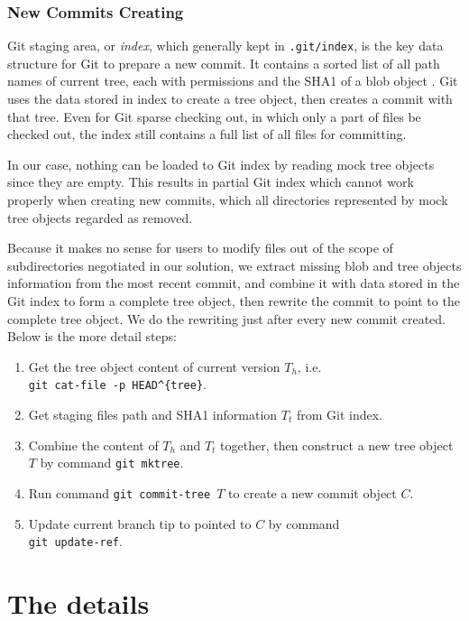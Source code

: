 \documentclass[preprint]{sigplanconf}
\begin{document}
\subsubsection{New Commits Creating}
Git staging area, or \emph{index}, which generally kept in \verb|.git/index|,
is the key data structure for Git to prepare a new commit.
It contains a sorted list of all path names of current tree, each with
permissions and the SHA1 of a blob object \cite{idx-format}.
Git uses the data stored in index to create a tree object, then creates a
commit with that tree.
Even for Git sparse checking out, in which only a part of files be checked
out, the index still contains a full list of all files for committing.

In our case, nothing can be loaded to Git index by reading mock tree objects
since they are empty.
This results in partial Git index which cannot work properly when creating new
commits, which all directories represented by mock tree objects regarded as
removed.

Because it makes no sense for users to modify files out of the scope of
subdirectories negotiated in our solution, we extract missing blob and tree
objects information from the most recent commit, and combine it with data
stored in the Git index to form a complete tree object, then rewrite the commit
to point to the complete tree object.
We do the rewriting just after every new commit created.
Below is the more detail steps:

\begin{enumerate}
  \item Get the tree object content of current version $T_h$, i.e. \\
        \verb|git cat-file -p HEAD^{tree}|.
  \item Get staging files path and SHA1 information $T_t$ from Git index.
  \item Combine the content of $T_h$ and $T_t$ together, then construct a new
        tree object $T$ by command \verb|git mktree|.
  \item Run command \verb|git commit-tree |$T$ to create a new commit object
        $C$.
  \item Update current branch tip to pointed to $C$ by command \\
        \verb|git update-ref|.
\end{enumerate}




\section{The details}
\end{document}
